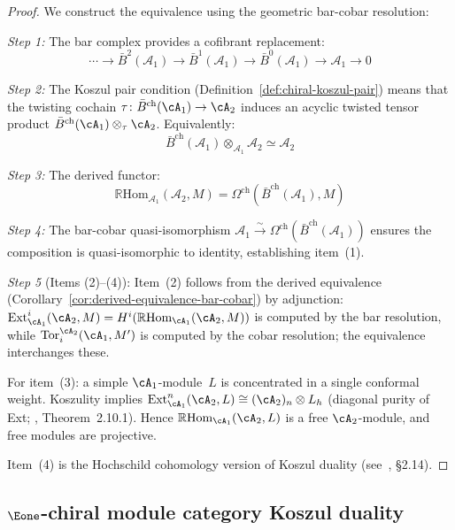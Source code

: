 \begin{proof}
We construct the equivalence using the geometric bar-cobar resolution:

\emph{Step 1:} The bar complex provides a cofibrant replacement:
\[\cdots \to \bar{B}^2(\mathcal{A}_1) \to \bar{B}^1(\mathcal{A}_1) \to \bar{B}^0(\mathcal{A}_1) \to \mathcal{A}_1 \to 0\]

\emph{Step 2:} The Koszul pair condition (Definition~\ref{def:chiral-koszul-pair}) means that the twisting cochain $\tau\colon \bar{B}^{\mathrm{ch}}(\cA_1) \to \cA_2$ induces an acyclic twisted tensor product $\bar{B}^{\mathrm{ch}}(\cA_1) \otimes_\tau \cA_2$.  Equivalently:
\[\bar{B}^{\text{ch}}(\mathcal{A}_1) \otimes_{\mathcal{A}_1} \mathcal{A}_2 \simeq \mathcal{A}_2\]

\emph{Step 3:} The derived functor:
\[\mathbb{R}\text{Hom}_{\mathcal{A}_1}(\mathcal{A}_2, M) = \Omega^{\text{ch}}(\bar{B}^{\text{ch}}(\mathcal{A}_1), M)\]

\emph{Step 4:} The bar-cobar quasi-isomorphism
$\mathcal{A}_1 \xrightarrow{\sim}
\Omega^{\mathrm{ch}}(\bar{B}^{\mathrm{ch}}(\mathcal{A}_1))$
ensures the composition is quasi-isomorphic to identity,
establishing item~(1).

\emph{Step 5} (Items (2)--(4)):
Item~(2) follows from the derived equivalence (Corollary~\ref{cor:derived-equivalence-bar-cobar}) by adjunction:
$\mathrm{Ext}^i_{\cA_1}(\cA_2, M)
= H^i(\mathbb{R}\mathrm{Hom}_{\cA_1}(\cA_2, M))$
is computed by the bar resolution, while
$\mathrm{Tor}_i^{\cA_2}(\cA_1, M')$
is computed by the cobar resolution; the equivalence interchanges
these.

For item~(3): a simple $\cA_1$-module~$L$ is concentrated in a
single conformal weight.  Koszulity implies
$\mathrm{Ext}^n_{\cA_1}(\cA_2, L) \cong (\cA_2)_n \otimes L_h$
(diagonal purity of Ext; \cite{BGS96}, Theorem~2.10.1).
Hence $\mathbb{R}\mathrm{Hom}_{\cA_1}(\cA_2, L)$ is a free
$\cA_2$-module, and free modules are projective.

Item~(4) is the Hochschild cohomology version of Koszul duality
(see~\cite{BGS96}, \S2.14).
\end{proof}

\subsection{\texorpdfstring{$\Eone$-chiral module category Koszul duality}{E1-chiral module category Koszul duality}}

